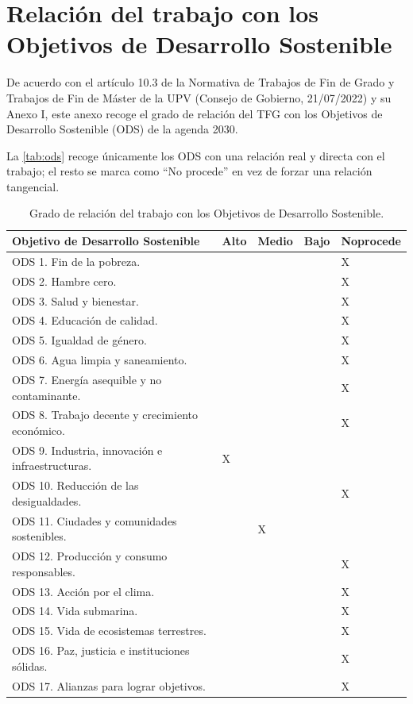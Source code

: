 
\chapter{Relación del trabajo con los Objetivos de Desarrollo Sostenible}
\label{cap:anexo-ods}

De acuerdo con el artículo 10.3 de la Normativa de Trabajos de Fin de Grado y Trabajos de Fin de Máster de la UPV (Consejo de Gobierno, 21/07/2022) y su Anexo I, este anexo recoge el grado de relación del TFG con los Objetivos de Desarrollo Sostenible (ODS) de la agenda 2030.

La \autoref{tab:ods} recoge únicamente los ODS con una relación real y directa con el trabajo; el resto se marca como \enquote{No procede} en vez de forzar una relación tangencial.

\begin{table}[htbp]
\centering
\caption{Grado de relación del trabajo con los Objetivos de Desarrollo Sostenible.}
\label{tab:ods}
\begin{tabularx}{\textwidth}{Xp{}p{}p{}p{}}
\toprule
\textbf{Objetivo de Desarrollo Sostenible} & \textbf{Alto} & \textbf{Medio} & \textbf{Bajo} & \textbf{No\newline procede} \\
\midrule
ODS 1. Fin de la pobreza. & & & & X \\
ODS 2. Hambre cero. & & & & X \\
ODS 3. Salud y bienestar. & & & & X \\
ODS 4. Educación de calidad. & & & & X \\
ODS 5. Igualdad de género. & & & & X \\
ODS 6. Agua limpia y saneamiento. & & & & X \\
ODS 7. Energía asequible y no contaminante. & & & & X \\
ODS 8. Trabajo decente y crecimiento económico. & & & & X \\
ODS 9. Industria, innovación e infraestructuras. & X & & & \\
ODS 10. Reducción de las desigualdades. & & & & X \\
ODS 11. Ciudades y comunidades sostenibles. & & X & & \\
ODS 12. Producción y consumo responsables. & & & & X \\
ODS 13. Acción por el clima. & & & & X \\
ODS 14. Vida submarina. & & & & X \\
ODS 15. Vida de ecosistemas terrestres. & & & & X \\
ODS 16. Paz, justicia e instituciones sólidas. & & & & X \\
ODS 17. Alianzas para lograr objetivos. & & & & X \\
\bottomrule
\end{tabularx}
\end{table}

